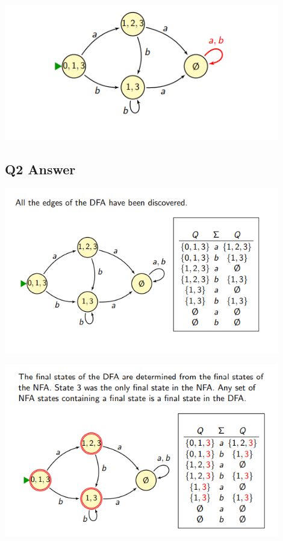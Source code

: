 \documentclass{article}
\begin{document}
\begin{center}
    \includegraphics[width=12cm]{6.png}
\end{center}

\newpage

\subsection*{Q2 Answer}

\begin{center}
    \includegraphics[width=12cm]{7.png}
\end{center}

\begin{center}
    \includegraphics[width=12cm]{8.png}
\end{center}
\end{document}
